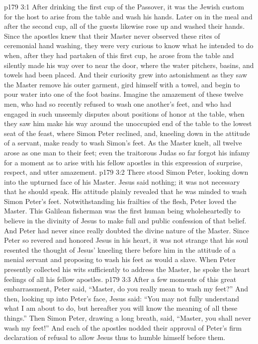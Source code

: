 \vs p179 3:1 After drinking the first cup of the Passover, it was the Jewish custom for the host to arise from the table and wash his hands. Later on in the meal and after the second cup, all of the guests likewise rose up and washed their hands. Since the apostles knew that their Master never observed these rites of ceremonial hand washing, they were very curious to know what he intended to do when, after they had partaken of this first cup, he arose from the table and silently made his way over to near the door, where the water pitchers, basins, and towels had been placed. And their curiosity grew into astonishment as they saw the Master remove his outer garment, gird himself with a towel, and begin to pour water into one of the foot basins. Imagine the amazement of these twelve men, who had so recently refused to wash one another’s feet, and who had engaged in such unseemly disputes about positions of honor at the table, when they saw him make his way around the unoccupied end of the table to the lowest seat of the feast, where Simon Peter reclined, and, kneeling down in the attitude of a servant, make ready to wash Simon’s feet. As the Master knelt, all twelve arose as one man to their feet; even the traitorous Judas so far forgot his infamy for a moment as to arise with his fellow apostles in this expression of surprise, respect, and utter amazement.
\vs p179 3:2 There stood Simon Peter, looking down into the upturned face of his Master. Jesus said nothing; it was not necessary that he should speak. His attitude plainly revealed that he was minded to wash Simon Peter’s feet. Notwithstanding his frailties of the flesh, Peter loved the Master. This Galilean fisherman was the first human being wholeheartedly to believe in the divinity of Jesus  to make full and public confession of that belief. And Peter had never since really doubted the divine nature of the Master. Since Peter so revered and honored Jesus in his heart, it was not strange that his soul resented the thought of Jesus’ kneeling there before him in the attitude of a menial servant and proposing to wash his feet as would a slave. When Peter presently collected his wits sufficiently to address the Master, he spoke the heart feelings of all his fellow apostles.
\vs p179 3:3 After a few moments of this great embarrassment, Peter said, “Master, do you really mean to wash my feet?” And then, looking up into Peter’s face, Jesus said: \textcolor{ubdarkred}{“You may not fully understand what I am about to do, but hereafter you will know the meaning of all these things.”} Then Simon Peter, drawing a long breath, said, “Master, you shall never wash my feet!” And each of the apostles nodded their approval of Peter’s firm declaration of refusal to allow Jesus thus to humble himself before them.
